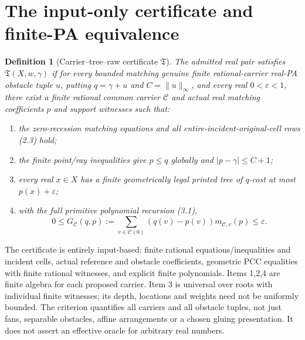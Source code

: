 \documentclass[11pt]{article}
\newtheorem{definition}[theorem]{Definition}
\begin{document}
\section{The input-only certificate and finite-PA equivalence}
\begin{definition}[Carrier--tree--raw certificate $\mathfrak T$]\label{d:certificate}
The admitted real pair satisfies $\mathfrak T(X,w,\gamma)$ if for \emph{every} bounded matching genuine finite rational-carrier real-PA obstacle tuple $u$, putting $q=\gamma+u$ and $C=\|u\|_\infty$, and every real $0<\varepsilon<1$, there exist a finite rational common carrier $\mathcal C$ and actual real matching coefficients $p$ and support witnesses such that:
\begin{enumerate}
\item the zero-recession matching equations and all entire-incident-original-cell rows (2.3) hold;
\item the finite point/ray inequalities give $p\leq q$ globally and $|p-\gamma|\leq C+1$;
\item \emph{every} real $x\in X$ has a \emph{finite geometrically legal printed tree} of $q$-cost at most $p(x)+\varepsilon$;
\item with the full primitive polynomial recursion (3.1),
\[
      0\leq G_{\mathcal C}(q,p):=
          \sum_{v\in\mathcal C(0)}(q(v)-p(v))m_{\mathcal C,v}(p)
                         \leq\varepsilon.                            \tag{5.1}
\]
\end{enumerate}
\end{definition}
The certificate is entirely input-based: finite rational equations/inequalities and incident cells, actual reference and obstacle coefficients, geometric PCC equalities with finite rational witnesses, and explicit finite polynomials. Items 1,2,4 are finite algebra for each proposed carrier. Item 3 is universal over roots with individual finite witnesses; its depth, locations and weights need not be uniformly bounded. The criterion quantifies all carriers and all obstacle tuples, not just fans, separable obstacles, affine arrangements or a chosen gluing presentation. It does not assert an effective oracle for arbitrary real numbers.
\end{document}
